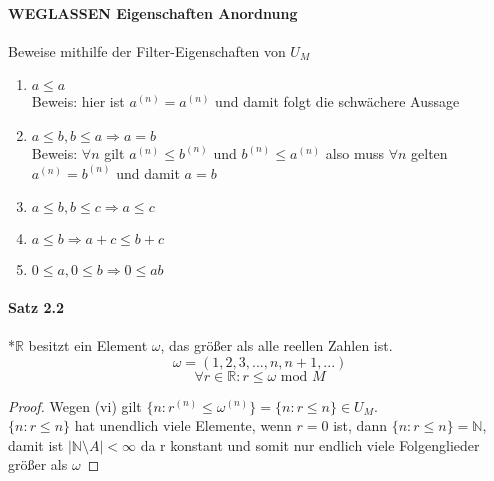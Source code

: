 \documentclass[a4paper]{article}
\begin{document}
\paragraph{\textbf{WEGLASSEN} Eigenschaften Anordnung} Beweise mithilfe der Filter-Eigenschaften von $ U_M $
\begin{enumerate}
     \item $ a \leqslant a $ \\
            Beweis: hier ist $ a^{(n)} = a ^{(n)} $ und damit folgt die schwächere Aussage 
     \item $ a \leqslant b, b \leqslant a \Rightarrow a = b $ \\
            Beweis: $ \forall n $ gilt $ a^{(n)} \leqslant b^{(n)} $ und $ b^{(n)} \leqslant a^{(n)} $ also muss 
            $ \forall n $ gelten $ a^{(n)} = b^{(n)} $ und damit $ a = b $
     \item $ a \leqslant b, b \leqslant c \Rightarrow a \leqslant c $ \\
     \item $ a \leqslant b \Rightarrow a + c \leqslant b + c $ \\ 
     \item $ 0 \leqslant a, 0 \leqslant b \Rightarrow 0 \leqslant ab $ \\

\end{enumerate}


\paragraph{Satz 2.2} *$\mathbb{R}$ besitzt ein Element $ \omega $, das größer als alle reellen Zahlen ist. 
$$ \omega = (1,2,3,...,n,n+1,...)  $$
$$ \forall r \in \mathbb{R} : r \leqslant \omega \text{ mod } M  $$
\begin{proof}
      Wegen (vi) gilt $ \{n: r^{(n)} \leqslant \omega^{(n)} \} = \{n: r \leqslant n\} \in U_M $. \\
      $ \{n: r \leqslant n\} $ hat unendlich viele Elemente, wenn $ r = 0 $ ist, dann $ \{n: r \leqslant n\} = \mathbb{N} $, 
      damit ist $ | \mathbb{N} \setminus A | < \infty $ da r konstant und somit nur endlich viele Folgenglieder größer als $ \omega $  
\end{proof}
\end{document}
